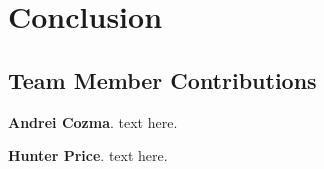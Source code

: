 
\section{Conclusion}




\appendix
\subsection{Team Member Contributions}

\textbf{Andrei Cozma}. text here.


\textbf{Hunter Price}. text here.


